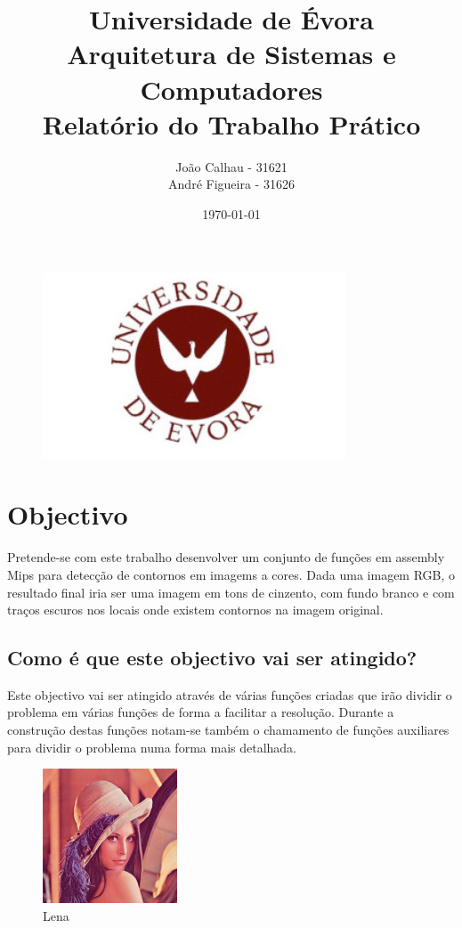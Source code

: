 \documentclass[a4paper,11pt]{article}
\date{\today}
\author{João Calhau - 31621 \\ André Figueira - 31626} %
\title{{\bf Universidade de Évora}\\Arquitetura de Sistemas e Computadores\\Relatório do Trabalho Prático}
\begin{document}
\maketitle
\begin{figure}[ht!]
\centering
\includegraphics[width=90mm]{universidade}
\label{overflow}
\end{figure}

\newpage

\tableofcontents

\newpage

\section{Objectivo}

\indent Pretende-se com este trabalho desenvolver um conjunto de funções em assembly Mips para detecção de contornos em imagems a cores. Dada uma imagem RGB, o resultado final iria ser uma imagem em tons de cinzento, com fundo branco e com traços escuros nos locais onde existem contornos na imagem original.

\subsection{Como é que este objectivo vai ser atingido?}

\indent Este objectivo vai ser atingido através de várias funções criadas que irão dividir o problema em várias funções de forma a facilitar a resolução. Durante a construção destas funções notam-se também o chamamento de funções auxiliares para dividir o problema numa forma mais detalhada.

\begin{figure}[ht!]
\centering
\includegraphics[width=40mm]{Lena512x512}
\caption{Lena}
\label{overflow}
\end{figure}
\end{document}
